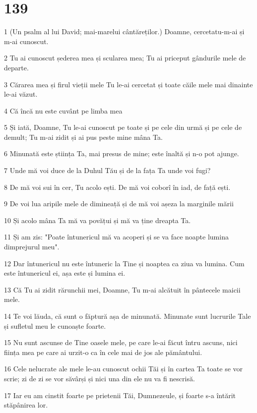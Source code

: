 \chapter{139}

\par 1 (Un psalm al lui David; mai-marelui cântăreților.) Doamne, cercetatu-m-ai și m-ai cunoscut.
\par 2 Tu ai cunoscut șederea mea și scularea mea; Tu ai priceput gândurile mele de departe.
\par 3 Cărarea mea și firul vieții mele Tu le-ai cercetat și toate căile mele mai dinainte le-ai văzut.
\par 4 Că încă nu este cuvânt pe limba mea
\par 5 Și iată, Doamne, Tu le-ai cunoscut pe toate și pe cele din urmă și pe cele de demult; Tu m-ai zidit și ai pus peste mine mâna Ta.
\par 6 Minunată este știința Ta, mai presus de mine; este înaltă și n-o pot ajunge.
\par 7 Unde mă voi duce de la Duhul Tău și de la fața Ta unde voi fugi?
\par 8 De mă voi sui în cer, Tu acolo ești. De mă voi coborî în iad, de față ești.
\par 9 De voi lua aripile mele de dimineață și de mă voi așeza la marginile mării
\par 10 Și acolo mâna Ta mă va povățui și mă va ține dreapta Ta.
\par 11 Și am zis: "Poate întunericul mă va acoperi și se va face noapte lumina dimprejurul meu".
\par 12 Dar întunericul nu este întuneric la Tine și noaptea ca ziua va lumina. Cum este întunericul ei, așa este și lumina ei.
\par 13 Că Tu ai zidit rărunchii mei, Doamne, Tu m-ai alcătuit în pântecele maicii mele.
\par 14 Te voi lăuda, că sunt o făptură așa de minunată. Minunate sunt lucrurile Tale și sufletul meu le cunoaște foarte.
\par 15 Nu sunt ascunse de Tine oasele mele, pe care le-ai făcut întru ascuns, nici ființa mea pe care ai urzit-o ca în cele mai de jos ale pământului.
\par 16 Cele nelucrate ale mele le-au cunoscut ochii Tăi și în cartea Ta toate se vor scrie; zi de zi se vor săvârși și nici una din ele nu va fi nescrisă.
\par 17 Iar eu am cinstit foarte pe prietenii Tăi, Dumnezeule, și foarte s-a întărit stăpânirea lor.
